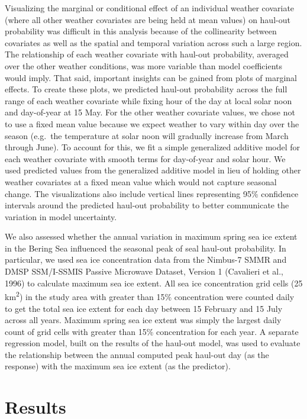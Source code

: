 \documentclass[fleqn,10pt,lineno]{wlpeerj} %
\begin{document}
Visualizing the marginal or conditional effect of an individual weather
covariate (where all other weather covariates are being held at mean values) on
haul-out probability was difficult in this analysis because of the collinearity
between covariates as well as the spatial and temporal variation across such a
large region. The relationship of each weather covariate with haul-out
probability, averaged over the other weather conditions, was more variable than
model coefficients would imply. That said, important insights can be gained from
plots of marginal effects. To create these plots, we predicted haul-out
probability across the full range of each weather covariate while fixing hour
of the day at local solar noon and day-of-year at 15 May. For the other weather
covariate values, we chose not to use a fixed mean value because we expect weather
to vary within day over the season (e.g.~the temperature at solar noon will
gradually increase from March through June). To account for this, we fit a simple generalized
additive model for each weather covariate with smooth terms for day-of-year and
solar hour. We used predicted values from the generalized additive model in lieu
of holding other weather covariates at a fixed mean value which would not capture
seasonal change. The visualizations
also include vertical lines representing 95\% confidence intervals around the
predicted haul-out probability to better communicate the variation in model
uncertainty.

We also assessed whether the annual variation in maximum spring sea ice extent in the
Bering Sea influenced the seasonal peak of seal haul-out probability. In
particular, we used sea ice concentration data from the Nimbus-7 SMMR and DMSP
SSM/I-SSMIS Passive Microwave Dataset, Version 1 (Cavalieri et al., 1996) to calculate
maximum sea ice extent. All sea ice concentration grid cells (25 km\textsuperscript{2}) in the
study area with greater than 15\% concentration were counted daily to get the total sea
ice extent for each day between 15 February and 15 July across all years.
Maximum spring sea ice extent was simply the largest daily count of grid cells
with greater than 15\% concentration for each year. A separate regression model,
built on the results of the haul-out model, was used to evaluate the relationship
between the annual computed peak haul-out day (as the response) with the
maximum sea ice extent (as the predictor).

\hypertarget{results}{%
\section*{Results}\label{results}}
\end{document}
